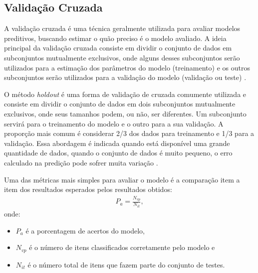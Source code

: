 \subsection{Validação Cruzada}

A validação cruzada é uma técnica geralmente utilizada para avaliar modelos preditivos, buscando estimar o quão preciso é o modelo avaliado. A ideia principal da validação cruzada consiste em dividir o conjunto de dados em subconjuntos mutualmente exclusivos, onde alguns desses subconjuntos serão utilizados para a estimação dos parâmetros do modelo (treinamento) e os outros subconjuntos serão utilizados para a validação do modelo (validação ou teste) \cite{kohavi1995}.

O método \textit{holdout} é uma forma de validação de cruzada comumente utilizada e consiste em dividir o conjunto de dados em dois subconjuntos mutualmente exclusivos, onde seus tamanhos podem, ou não, ser diferentes. Um subconjunto servirá para o treinamento do modelo e o outro para a sua validação. A proporção mais comum é considerar 2/3 dos dados para treinamento e 1/3 para a validação. Essa abordagem é indicada quando está disponível uma grande quantidade de dados, quando o conjunto de dados é muito pequeno, o erro calculado na predição pode sofrer muita variação \cite{kohavi1995}.

Uma das métricas mais simples para avaliar o modelo é a comparação item a item dos resultados esperados pelos resultados obtidos:
%
\begin{align}
P_{a}=\frac{N_{vp}}{N_{it}},
\end{align}
%
onde:

\begin{itemize}
    \item \(P_{a}\) é a porcentagem de acertos do modelo,
    \item \(N_{vp}\) é o número de itens classificados corretamente pelo modelo e
    \item \(N_{it}\) é o número total de itens que fazem parte do conjunto de testes.
\end{itemize}
